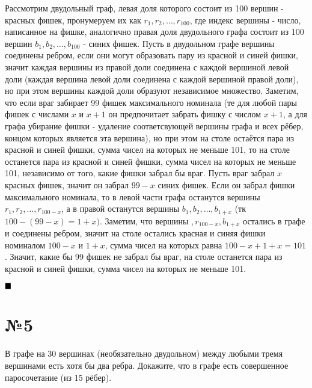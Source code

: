 \documentclass[a4paper, 16pt]{article}
\newenvironment{proof}[1][Доказательство]{%
	\begin{trivlist}
		\item[\hskip \labelsep {\bfseries #1:}]
		\item \hspace{14pt}
	}{
		$ \hfill\blacksquare $
	\end{trivlist}
	\hfill\break
}
\begin{document}
	\begin{proof}
		Рассмотрим двудольный граф, левая доля которого состоит из 100 вершин - красных фишек, пронумеруем их как $r_1, r_2,\dots ,r_{100}$, где индекс вершины - число, написанное на фишке, аналогично правая доля двудольного графа состоит из 100 вершин $b_1,b_2,\dots,b_{100}$ - синих фишек. Пусть в двудольном графе вершины соединены ребром, если они могут образовать пару из красной и синей фишки, значит каждая вершины из правой доли соединена с каждой вершиной левой доли (каждая вершина левой доли соединена с каждой вершиной правой доли), но при этом вершины каждой доли образуют независимое множество. Заметим, что если враг забирает 99 фишек максимального номинала (те для любой пары фишек с числами $x$ и $x+1$ он предпочитает забрать фишку с числом $x+1$, а для  графа убирание фишки - удаление соответсвующей вершины графа и всех рёбер, концом которых является эта вершина), но при этом на столе остаётся пара из красной и синей фишки, сумма чисел на которых не
		меньше 101, то на столе останется пара из красной и синей фишки, сумма чисел на которых не меньше 101, независимо от того, какие фишки забрал бы враг. Пусть враг забрал $x$ красных фишек, значит он забрал $99-x$ синих фишек. Если он забрал фишки максимального номинала, то в левой части графа останутся вершины $r_1,r_2,\dots,r_{100-x}$, а в правой останутся вершины $b_1,b_2,\dots,b_{1+x}$ (тк $100 - (99-x) = 1 + x)$. Заметим, что вершины $,r_{100-x}, b_{1+x}$ остались в графе и соединены ребром, значит на столе остались красная и синяя фишки номиналом $100-x$ и $1 + x$, сумма чисел на которых равна $100-x+1+x=101$. Значит, какие бы 99 фишек не забрал бы враг, на столе останется пара из красной и синей фишки, сумма чисел на которых не
		меньше 101.
	\end{proof}
	
	\section*{№5}
	
		В графе на 30 вершинах (необязательно двудольном) между любыми тремя вершинами есть хотя
		бы два ребра. Докажите, что в графе есть совершенное паросочетание (из 15 рёбер).
	
\end{document}
